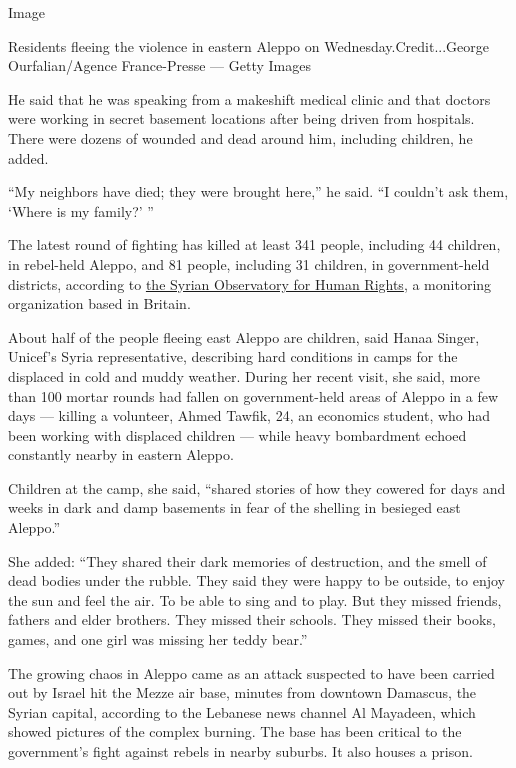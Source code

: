 Image

Residents fleeing the violence in eastern Aleppo on
Wednesday.Credit...George Ourfalian/Agence France-Presse --- Getty
Images

He said that he was speaking from a makeshift medical clinic and that
doctors were working in secret basement locations after being driven
from hospitals. There were dozens of wounded and dead around him,
including children, he added.

``My neighbors have died; they were brought here,'' he said. ``I
couldn't ask them, `Where is my family?' ''

The latest round of fighting has killed at least 341 people, including
44 children, in rebel-held Aleppo, and 81 people, including 31 children,
in government-held districts, according to
\href{http://www.nytimes3xbfgragh.onion/2013/04/10/world/middleeast/the-man-behind-the-casualty-figures-in-syria.html}{the
Syrian Observatory for Human Rights}, a monitoring organization based in
Britain.

About half of the people fleeing east Aleppo are children, said Hanaa
Singer, Unicef's Syria representative, describing hard conditions in
camps for the displaced in cold and muddy weather. During her recent
visit, she said, more than 100 mortar rounds had fallen on
government-held areas of Aleppo in a few days --- killing a volunteer,
Ahmed Tawfik, 24, an economics student, who had been working with
displaced children --- while heavy bombardment echoed constantly nearby
in eastern Aleppo.

Children at the camp, she said, ``shared stories of how they cowered for
days and weeks in dark and damp basements in fear of the shelling in
besieged east Aleppo.''

She added: ``They shared their dark memories of destruction, and the
smell of dead bodies under the rubble. They said they were happy to be
outside, to enjoy the sun and feel the air. To be able to sing and to
play. But they missed friends, fathers and elder brothers. They missed
their schools. They missed their books, games, and one girl was missing
her teddy bear.''

The growing chaos in Aleppo came as an attack suspected to have been
carried out by Israel hit the Mezze air base, minutes from downtown
Damascus, the Syrian capital, according to the Lebanese news channel Al
Mayadeen, which showed pictures of the complex burning. The base has
been critical to the government's fight against rebels in nearby
suburbs. It also houses a prison.

